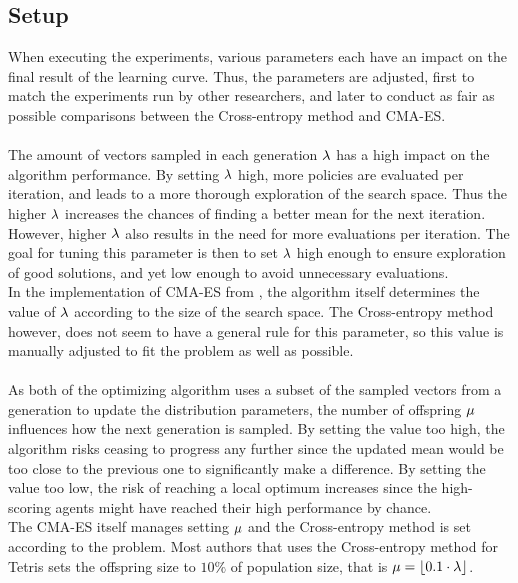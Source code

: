 \subsection{Setup}

When executing the experiments, various parameters each have 
an impact on the final result of the learning curve. Thus, the parameters
are adjusted, first to match the experiments run by other researchers, 
and later to conduct as fair as possible comparisons between 
the Cross-entropy method and CMA-ES.\\
\\
The amount of vectors sampled in each generation $\lambda$
has a high impact on the algorithm performance. By setting $\lambda$
high, more policies are evaluated per iteration, and leads to a more thorough 
exploration of the search space. Thus the higher $\lambda$ increases the
chances of finding a better mean for the next iteration.
However, higher $\lambda$ also results in the
need for more evaluations per iteration. The goal for 
tuning this parameter is then
to set $\lambda$ high enough to ensure 
exploration of good solutions, and yet 
low enough to avoid unnecessary evaluations.\\
In the implementation of CMA-ES from \shark , 
the algorithm  itself determines
the value of $\lambda$ according to the 
size of the search space. 
The Cross-entropy method however, does not seem to have a 
general rule for this parameter,
so this value is manually adjusted to fit the 
problem as well as possible.\\
\\
As both of the optimizing algorithm uses a subset of the sampled vectors
from a generation to update the distribution parameters, the number of 
offspring $\mu$ influences how the next generation is sampled.
By setting the value too high, the algorithm risks ceasing to progress any 
further since the updated mean would be too close to the previous one to 
significantly make a difference. By setting the value too low,
the risk of reaching a local optimum increases since the high-scoring agents
might have reached their high performance by chance.\\
The CMA-ES itself manages setting $\mu$ and the Cross-entropy method
is set according to the problem. Most authors that uses the Cross-entropy method for Tetris
sets the offspring size to $10\%$ of population size, that is 
$\mu = \lfloor 0.1 \cdot \lambda \rfloor $.\\
